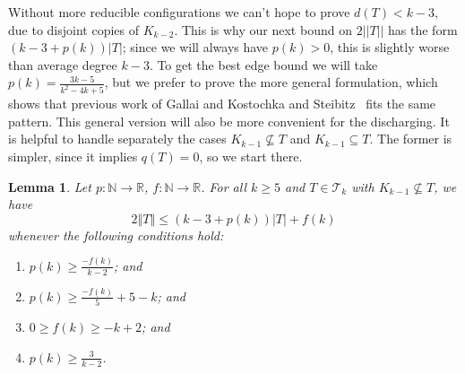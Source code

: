 \documentclass[12pt]{article}
\theoremstyle{plain}
\newtheorem{lem}[thm]{Lemma}
\theoremstyle{definition}
\theoremstyle{remark}
\newcommand{\fancy}[1]{\mathcal{#1}}
\newcommand{\IN}{\mathbb{N}}
\newcommand{\IR}{\mathbb{R}}
\newcommand{\T}{\fancy{T}}
\newcommand{\card}[1]{\left|#1\right|}
\newcommand{\size}[1]{\left\Vert#1\right\Vert}
\newcommand{\func}[3]{#1\colon #2 \rightarrow #3}
\begin{document}
Without more reducible configurations we can't hope to prove $d(T) < k-3$, due
to disjoint copies of $K_{k-2}$.  This is why our next bound on
$2||T||$ has the form $(k-3 + p(k))|T|$; since we will always have $p(k)>0$,
this is slightly worse than average degree $k-3$.  To get the best edge bound
we will take $p(k)=\frac{3k-5}{k^2 - 4k + 5}$, but we prefer to prove the more general
formulation, which shows that previous work of Gallai \cite{gallai1963kritische}
and Kostochka and Steibitz~\cite{kostochkastiebitzedgesincriticalgraph} fits
the same pattern.  This general version will also be more
convenient for the discharging.  %
It is helpful to handle separately the cases $K_{k-1}\not\subseteq T$ and
$K_{k-1}\subseteq T$.  The former is simpler, since it implies $q(T)=0$, so we
start there.

\begin{lem}\label{BoundFamilyWithoutKKMinusOne}
	Let $\func{p}{\IN}{\IR}$, $\func{f}{\IN}{\IR}$.
	For all $k \ge 5$ and $T \in \T_k$ with $K_{k-1} \not \subseteq T$, we have
	\[2\size{T} \le (k-3 + p(k))\card{T} + f(k)\]
	whenever the following conditions hold:
	\begin{enumerate}
		\item $p(k) \ge \frac{-f(k)}{k-2}$; and
		\item $p(k) \ge \frac{-f(k)}{5} + 5 - k$; and
		\item $0\ge f(k)\ge -k+2$; and
		\item $p(k) \ge \frac{3}{k-2}$.
	\end{enumerate}
\end{lem}
\end{document}
